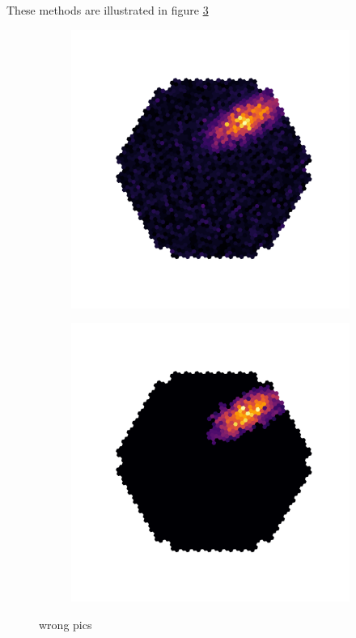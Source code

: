 These methods are illustrated in figure \ref{fig:disp_magic}

\begin{figure}
    \begin{subfigure}{0.5\textwidth}
        \includegraphics[width=0.9\linewidth]{Plots/hillas_raw.pdf} 
        \label{fig:3}
    \end{subfigure}
    \begin{subfigure}{0.5\textwidth}
        \includegraphics[width=0.9\linewidth]{Plots/hillas_cleaned.pdf}
        \label{fig:2}
    \end{subfigure}
    \caption{wrong pics}
    \label{fig:disp_magic}
\end{figure}

